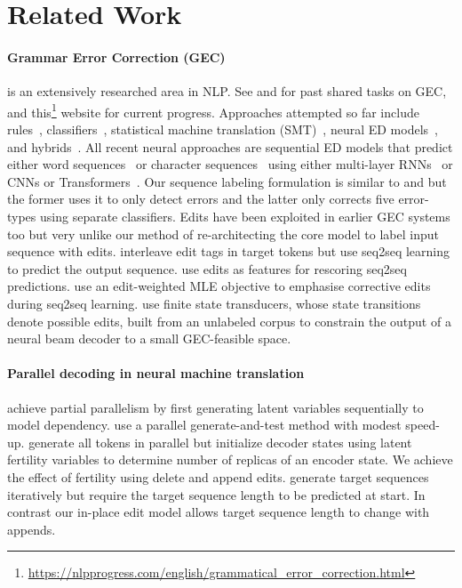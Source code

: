 \documentclass[11pt,a4paper]{article}
\begin{document}
\section{Related Work}
\label{sec:related}
\paragraph{Grammar Error Correction (GEC)} is an extensively researched area in NLP. See \citet{ngconll} and \citet{ng2014conll} for past shared tasks on GEC, and this\footnote{\url{https://nlpprogress.com/english/grammatical\_error\_correction.html}} website
for current progress.
Approaches attempted so far include rules~\cite{felice2014grammatical}, classifiers~\cite{rozovskaya2016grammatical}, statistical machine translation (SMT)~\cite{junczys2016phrase}, neural ED models~\cite{chollampatt2018mlconv,junczys2018approaching,ge2018fluency}, and hybrids~\cite{Grundkiewicz2018}.  All recent neural approaches are sequential ED models that predict either word sequences~\cite{zhao2019improving,lichtarge2019} or character sequences~\cite{XieAAJN16} using either multi-layer RNNs~\cite{ji2017nested,Grundkiewicz2018} or CNNs\cite{chollampatt2018mlconv,ge2018fluency} or Transformers~\cite{junczys2018approaching,lichtarge2019}. 
Our sequence labeling formulation is similar to \cite{Yannakoudakis2017} and \cite{kaili2018simple} but the former
uses it to only detect errors
and the latter only corrects five error-types using separate classifiers.
Edits have been exploited in earlier GEC systems too but very unlike our method of re-architecting the core model to label input sequence with edits.
\citet{SchmaltzKRS17} interleave edit tags in target tokens but use seq2seq learning to predict the output sequence. \citet{chollampatt2018mlconv} use edits as features for rescoring seq2seq predictions. \citet{junczys2018approaching} use an edit-weighted MLE objective to emphasise corrective edits during seq2seq learning. 
\citet{stahlberg2019neural} use finite state transducers, whose state transitions denote possible edits, built from an unlabeled corpus to constrain the output of a neural beam decoder to a small GEC-feasible space.
\paragraph{Parallel decoding in neural machine translation}
\citet{kaiser18a} achieve partial parallelism by first generating latent variables sequentially to model dependency.
\citet{Stern2018} use a parallel generate-and-test method with modest speed-up.   \citet{gu2018} generate all tokens in parallel but initialize decoder states using latent fertility variables to determine number of replicas of an encoder state. We achieve the effect of fertility using delete and append edits. \citet{Lee2018} generate target sequences iteratively but require the target sequence length to be predicted at start. In contrast our in-place edit model allows target sequence length to change with appends.
\end{document}
